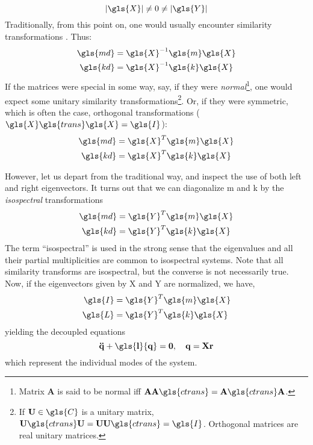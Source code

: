 \begin{equation}
	\left\vert{\gls{X}}\right\vert \neq 0 \neq \left\vert{\gls{Y}}\right\vert \label{eqn:asptn_defective}
\end{equation}
Traditionally, from this point on, one would usually encounter similarity
transformations \citep{watkins2010fundamentals}. Thus:
\begin{align}
 	\gls{md} &= \gls{X}^{-1}\gls{m}\gls{X}\\
 	\gls{kd} &= \gls{X}^{-1}\gls{k}\gls{X}
\end{align}
If the matrices were special in some way, say, if they were \emph{normal}\footnote{%
Matrix $\mathbf{A}$ is said to be normal iff 
$\mathbf{AA}\gls{ctrans} = \mathbf{A}\gls{ctrans}\mathbf{A}$.}, 
one would expect some unitary similarity transformations\footnote{If $\mathbf{U} \in \gls{C}$ 
is a unitary matrix, $\mathbf{U}\gls{ctrans}\mathbf{U} = \mathbf{UU}\gls{ctrans} = \gls{I}$. 
Orthogonal matrices are real unitary matrices.}. 
Or, if they were symmetric, which is often the case, 
orthogonal transformations ($\gls{X}\gls{trans}\gls{X} = \gls{I}$):
\begin{align}	
 	\gls{md} &= \gls{X}^{T}\gls{m}\gls{X}\\
 	\gls{kd} &= \gls{X}^{T}\gls{k}\gls{X}
\end{align}

However, let us depart from the traditional way, and inspect the use of both left
and right eigenvectors. It turns out that we can diagonalize \gls{m} and 
\gls{k} by the \emph{isospectral} transformations \citep{Chu200896}
\begin{align}
 	\gls{md} &= \gls{Y}^T\gls{m}\gls{X}\\
 	\gls{kd} &= \gls{Y}^T\gls{k}\gls{X}
\end{align}
The term “isospectral” is used in the strong sense that the eigenvalues and 
all their partial multiplicities are common to isospectral systems. 
Note that all similarity transforms are isospectral, but the converse is not 
necessarily true. Now, if the eigenvectors given by \gls{X} and \gls{Y}
are normalized, we have,
\begin{subequations}
\label{eqn:MK_diag}
\begin{align}
	\gls{I} &= \gls{Y}^T\gls{m}\gls{X}\\
	\gls{L} &= \gls{Y}^T\gls{k}\gls{X}
\end{align}
\end{subequations}
yielding the decoupled equations
\[ \mathbf{\ddot{q} + \gls{l}{q} = 0, \quad q = Xr}\]
which represent the individual modes of the system.

